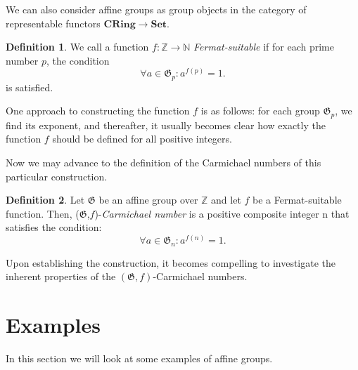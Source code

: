 \documentclass{article}
\theoremstyle{definition}
\theoremstyle{definition}
\newtheorem{definition}{Definition}
\begin{document}
We can also consider affine groups as group objects in the category of representable functors \newline $\mathbf{CRing}\xrightarrow{}\mathbf{Set}$.



\begin{definition}
    We call a function $f:\mathbb{Z} \xrightarrow{} \mathbb{N}$ \textit{Fermat-suitable} if for each prime number $p$, the condition
    $$\forall a \in \mathfrak{G}_p : a^{f(p)} = 1.$$
    is satisfied.
\end{definition}
One approach to constructing the function $f$ is as follows: for each group $\mathfrak{G}_p$, we find its exponent, and thereafter, it usually becomes clear how exactly the function $f$ should be defined for all positive integers.

Now we may advance to the definition of the Carmichael numbers of this particular construction.

\begin{definition} Let $\mathfrak{G}$ be an affine 
group over $\mathbb{Z}$ and let $f$ be a Fermat-suitable function. Then, ($\mathfrak{G}$,$f$)-\textit{Carmichael number} is a positive composite integer n that satisfies the condition: $$\forall a \in \mathfrak{G}_n : a^{f(n)} = 1.$$ 
\end{definition}

Upon establishing the construction, it becomes compelling to investigate the inherent properties of the $(\mathfrak{G}, f)$-Carmichael numbers.

\newpage
\section{Examples}
In this section we will look at some examples of affine groups.
\end{document}
